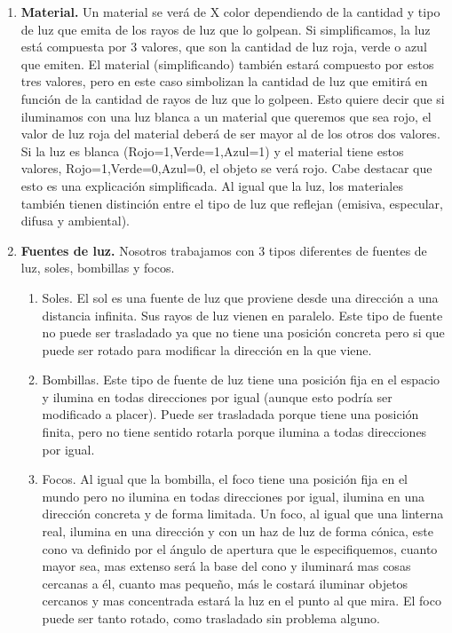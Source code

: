 \documentclass[12pt,a4paper]{article}
\begin{document}
\begin{enumerate}
\begin{enumerate}
\begin{enumerate}
\item \textbf{Material.}
Un material se verá de X color dependiendo de la cantidad y tipo de luz que emita de los rayos de luz que lo golpean. Si simplificamos, la luz está compuesta por 3 valores, que son la cantidad de luz roja, verde o azul que emiten. El material (simplificando) también estará compuesto por estos tres valores, pero en este caso simbolizan la cantidad de luz que emitirá en función de la cantidad de rayos de luz que lo golpeen. Esto quiere decir que si iluminamos con una luz blanca a un material que queremos que sea rojo, el valor de luz roja del material deberá de ser mayor al de los otros dos valores. Si la luz es blanca (Rojo=1,Verde=1,Azul=1) y el material tiene estos valores, {Rojo=1,Verde=0,Azul=0}, el objeto se verá rojo.\newline
Cabe destacar que esto es una explicación simplificada. Al igual que la luz, los materiales también tienen distinción entre el tipo de luz que reflejan (emisiva, especular, difusa y ambiental).

\item \textbf{Fuentes de luz.}
Nosotros trabajamos con 3 tipos diferentes de fuentes de luz, soles, bombillas y focos. 
\begin{enumerate}
\item {Soles.}
El sol es una fuente de luz que proviene desde una dirección a una distancia infinita. Sus rayos de luz vienen en paralelo.\newline
Este tipo de fuente no puede ser trasladado ya que no tiene una posición concreta pero si que puede ser rotado para modificar la dirección en la que viene.
\item {Bombillas.}
Este tipo de fuente de luz tiene una posición fija en el espacio y ilumina en todas direcciones por igual (aunque esto podría ser modificado a placer).\newline
Puede ser trasladada porque tiene una posición finita, pero no tiene sentido rotarla porque ilumina a todas direcciones por igual.
\item {Focos.}
Al igual que la bombilla, el foco tiene una posición fija en el mundo pero no ilumina en todas direcciones por igual, ilumina en una dirección concreta y de forma limitada. Un foco, al igual que una linterna real, ilumina en una dirección y con un haz de luz de forma cónica, este cono va definido por el ángulo de apertura que le especifiquemos, cuanto mayor sea, mas extenso será la base del cono y iluminará mas cosas cercanas a él, cuanto mas pequeño, más le costará iluminar objetos cercanos y mas concentrada estará la luz en el punto al que mira.\newline 
El foco puede ser tanto rotado, como trasladado sin problema alguno.
\end{enumerate}
\end{enumerate}


\end{enumerate}
\end{enumerate}
\end{document}
